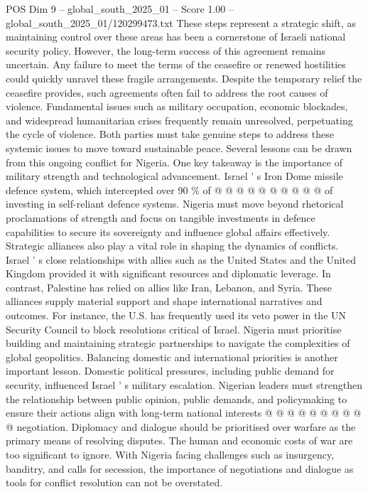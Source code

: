 \begin{textsample}{POS Dim 9 – global\_south\_2025\_01 – Score 1.00 – global\_south\_2025\_01/120299473.txt}
These steps represent a strategic shift, as maintaining control over these areas has been a cornerstone of Israeli national security policy.
However, the long-term success of this agreement remains uncertain.
Any failure to meet the terms of the ceasefire or renewed hostilities could quickly unravel these fragile arrangements.
Despite the temporary relief the ceasefire provides, such agreements often fail to address the root causes of violence.
Fundamental issues such as military occupation, economic blockades, and widespread humanitarian crises frequently remain unresolved, perpetuating the cycle of violence.
Both parties must take genuine steps to address these systemic issues to move toward sustainable peace.
Several lessons can be drawn from this ongoing conflict for Nigeria.
One key takeaway is the importance of military strength and technological advancement.
Israel ' s Iron Dome missile defence system, which intercepted over 90 \% of @ @ @ @ @ @ @ @ @ @ of investing in self-reliant defence systems.
Nigeria must move beyond rhetorical proclamations of strength and focus on tangible investments in defence capabilities to secure its sovereignty and influence global affairs effectively.
Strategic alliances also play a vital role in shaping the dynamics of conflicts.
Israel ' s close relationships with allies such as the United States and the United Kingdom provided it with significant resources and diplomatic leverage.
In contrast, Palestine has relied on allies like Iran, Lebanon, and Syria.
These alliances supply material support and shape international narratives and outcomes.
For instance, the U.S. has frequently used its veto power in the UN Security Council to block resolutions critical of Israel.
Nigeria must prioritise building and maintaining strategic partnerships to navigate the complexities of global geopolitics.
Balancing domestic and international priorities is another important lesson.
Domestic political pressures, including public demand for security, influenced Israel ' s military escalation.
Nigerian leaders must strengthen the relationship between public opinion, public demands, and policymaking to ensure their actions align with long-term national interests @ @ @ @ @ @ @ @ @ @ negotiation.
Diplomacy and dialogue should be prioritised over warfare as the primary means of resolving disputes.
The human and economic costs of war are too significant to ignore.
With Nigeria facing challenges such as insurgency, banditry, and calls for secession, the importance of negotiations and dialogue as tools for conflict resolution can not be overstated.

\end{textsample}
